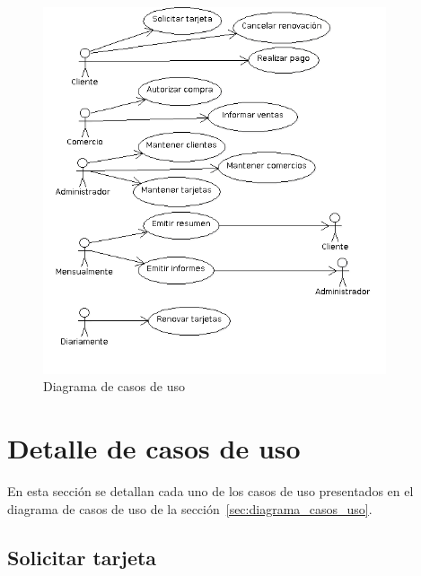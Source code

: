 \begin{figure}[htb]
\begin{center}
\includegraphics[width=0.9\textwidth]{images/mod_casosuso_diagrama.png}
\end{center}
\caption{Diagrama de casos de uso}
\label{fig:modcasosuso:diagramacasos}
\end{figure}

\FloatBarrier

\section{Detalle de casos de uso}

En esta sección se detallan cada uno de los casos de uso presentados en el
diagrama de casos de uso de la sección~\ref{sec:diagrama_casos_uso}.

\subsection{Solicitar tarjeta}


